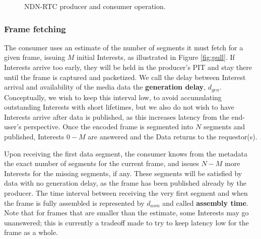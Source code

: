 \documentclass{icn/sig-alternate-2013} %
\newcommand{\ndnrtcName}{NDN-RTC} %
\begin{document}
\begin{figure}[t!]
\centering
{}\qquad
{}
\caption{\ndnrtcName{} producer and consumer operation.}
\end{figure}

\subsubsection{Frame fetching}

The consumer uses an estimate of the number of segments it must fetch for a given frame, issuing $M$ initial Interests, as illustrated in Figure \ref{fig:pull}. If Interests arrive too early, they will be held in the producer's PIT and stay there until the frame is captured and packetized. We call the delay between Interest arrival and availability of the media data the \textbf{generation delay}, $d_{gen}$. Conceptually, we wish to keep this interval low, to avoid accumulating outstanding Interests with short lifetimes, but we also do not wish to have Interests arrive after data is published, as this increases latency from the end-user's perspective.  Once the encoded frame is segmented into $N$ segments and published, Interests $0 - M$ are answered and the Data returns to the requestor(s). 

Upon receiving the first data segment, the consumer knows from the metadata the exact number of segments for the current frame, and issues $N - M$ more Interests for the missing segments, if any. These segments will be satisfied by data with no generation delay, as the frame has been published already by the producer. The time interval between receiving the very first segment and when the frame is fully assembled is represented by $d_{asm}$ and called \textbf{assembly time}. Note that for frames that are smaller than the estimate, some Interests may go unanswered; this is currently a tradeoff made to try to keep latency low for the frame as a whole. %
 
\end{document}
